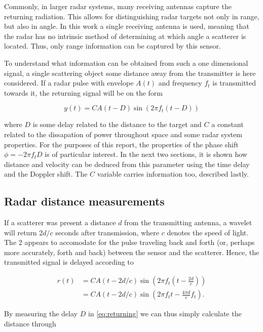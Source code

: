 Commonly, in larger radar systems, many receiving antennas capture the returning radiation. This allows for distinguishing radar targets not only in range, but also in angle. In this work a single receiving antenna is used, meaning that the radar has no intrinsic method of determining at which angle a scatterer is located. Thus, only range information can be captured by this sensor. 

To understand what information can be obtained from such a one dimensional signal, a single scattering object some distance away from the transmitter is here considered. If a radar pulse with envelope $A(t)$ and frequency $f_t$ is transmitted towards it, the returning signal will be on the form \citep{richards_2014}

\begin{equation}\label{eq:returning}
	y(t) = CA(t-D)\sin(2\pi f_t (t-D))
\end{equation}

where $D$ is some delay related to the distance to the target and $C$ a constant related to the dissapation of power throughout space and some radar system properties. For the purposes of this report, the properties of the phase shift $\phi=-2\pi f_tD$ is of particular interest. In the next two sections, it is shown how distance and velocity can be deduced from this parameter using the time delay and the Doppler shift. The $C$ variable carries information too, described lastly. 

\subsection{Radar distance measurements}

If a scatterer was present a distance $d$ from the transmitting antenna, a wavelet will return $2d/c$ seconds after transmission, where $c$ denotes the speed of light. The 2 appears to accomodate for the pulse traveling back and forth (or, perhaps more accurately, forth and back) between the sensor and the scatterer. Hence, the transmitted signal is delayed according to 

\begin{equation}
	\begin{split}
		r(t) 
		& = CA(t-2d/c)\sin(2\pi f_t(t - \frac{2d}{c})) \\
		& = CA(t-2d/c)\sin(2\pi f_tt - \frac{4\pi d}{c}f_t).
	\end{split}
\end{equation}

By measuring the delay $D$ in \ref{eq:returning} we can thus simply calculate the distance through

